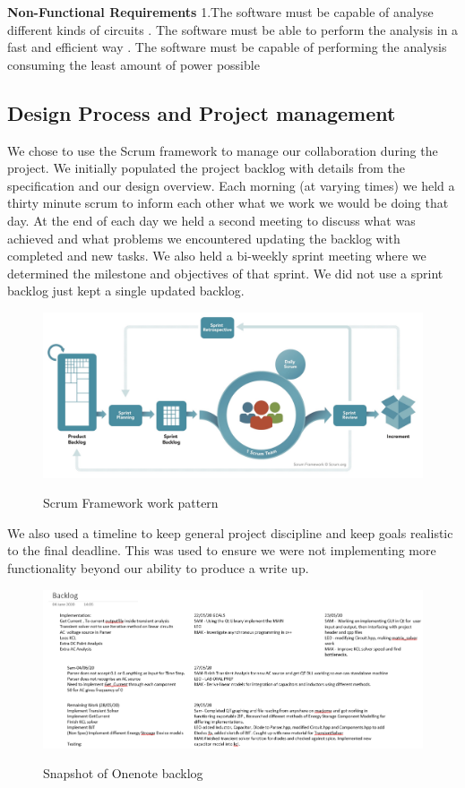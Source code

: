 \documentclass{article}
\begin{document}
\bigbreak

\textbf{Non-Functional Requirements}
\newline
1.The software must be capable of analyse different kinds of circuits
. The software must be able to perform the analysis in a fast and efficient way
. The software must be capable of performing the analysis consuming the least amount of power possible

\newpage
\subsection{Design Process and Project management}

We chose to use the Scrum framework to manage our collaboration during the project. We initially populated the project backlog with details from the specification and our design overview. Each morning (at varying times) we held a thirty minute scrum to inform each other what we work we would be doing that day. At the end of each day we held a second meeting to discuss what was achieved and what problems we encountered updating the backlog with completed and new tasks.
We also held a bi-weekly sprint meeting where we determined the milestone and objectives of that sprint. We did not use a sprint backlog just kept a single updated backlog. 

\begin{figure}[h]
    \caption{Scrum Framework work pattern}
    \centering
    \includegraphics[width=\textwidth]{images/ScrumFramework.jpg}
    \label{fig:Scrum}
\end{figure}
We also used a timeline to keep general project discipline and keep goals realistic to the final deadline. This was used to ensure we were not implementing more functionality beyond our ability to produce a write up.
\begin{figure}[h]
    \caption{Snapshot of Onenote backlog}
    \centering
    \includegraphics[width=12cm]{images/Backlog.PNG}
    \label{fig:BackLog}
\end{figure}
\end{document}
